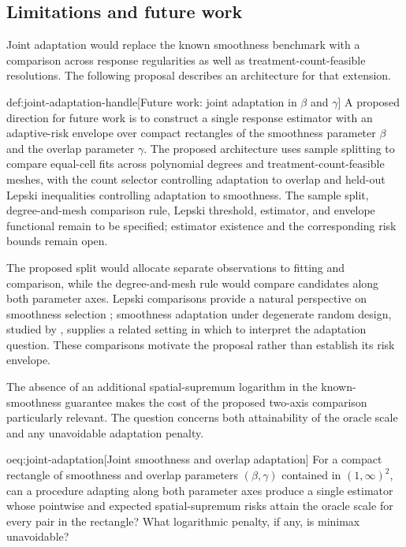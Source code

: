 \subsection{Limitations and future work}

Joint adaptation would replace the known smoothness benchmark with a comparison across response regularities as well as treatment-count-feasible resolutions. The following proposal describes an architecture for that extension.
\begin{remarkv}{def:joint-adaptation-handle}[Future work: joint adaptation in $\beta$ and $\gamma$]
A proposed direction for future work is to construct a single response estimator with an adaptive-risk envelope over compact rectangles of the smoothness parameter \(\beta\) and the overlap parameter \(\gamma\). The proposed architecture uses sample splitting to compare equal-cell fits across polynomial degrees and treatment-count-feasible meshes, with the count selector controlling adaptation to overlap and held-out Lepski inequalities controlling adaptation to smoothness. The sample split, degree-and-mesh comparison rule, Lepski threshold, estimator, and envelope functional remain to be specified; estimator existence and the corresponding risk bounds remain open.
\end{remarkv}

The proposed split would allocate separate observations to fitting and comparison, while the degree-and-mesh rule would compare candidates along both parameter axes. Lepski comparisons provide a natural perspective on smoothness selection \citep{lepski1997}; smoothness adaptation under degenerate random design, studied by \citet{Gaiffas2005AdaptiveDegenerateDesign}, supplies a related setting in which to interpret the adaptation question. These comparisons motivate the proposal rather than establish its risk envelope.

The absence of an additional spatial-supremum logarithm in the known-smoothness guarantee makes the cost of the proposed two-axis comparison particularly relevant. The question concerns both attainability of the oracle scale and any unavoidable adaptation penalty.
\begin{remarkv}{oeq:joint-adaptation}[Joint smoothness and overlap adaptation]
For a compact rectangle of smoothness and overlap parameters \((\beta,\gamma)\) contained in \((1,\infty)^2\), can a procedure adapting along both parameter axes produce a single estimator whose pointwise and expected spatial-supremum risks attain the oracle scale for every pair in the rectangle? What logarithmic penalty, if any, is minimax unavoidable?
\end{remarkv}


